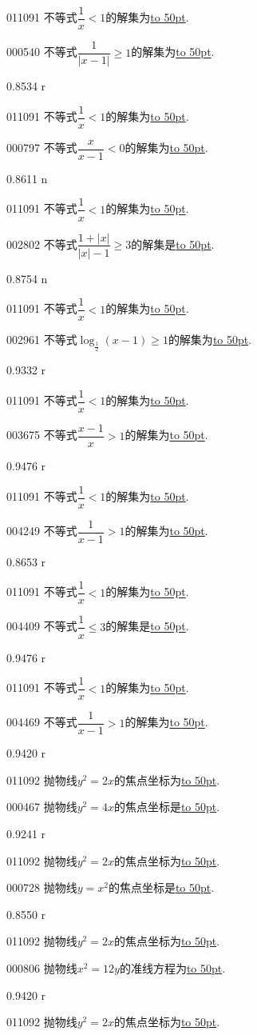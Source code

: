 \documentclass[10pt,a4paper]{article}
\newcommand{\blank}[1]{\underline{\hbox to #1pt{}}}
\begin{document}
011091	不等式$\dfrac 1x<1$的解集为\blank{50}.

000540	不等式$\dfrac1{|x-1|}\ge 1 $的解集为\blank{50}.

0.8534 r

011091	不等式$\dfrac 1x<1$的解集为\blank{50}.

000797	不等式$\dfrac x{x-1}<0$的解集为\blank{50}.

0.8611 n

011091	不等式$\dfrac 1x<1$的解集为\blank{50}.

002802	不等式$\dfrac{1+|x|}{|x|-1}\ge 3$的解集是\blank{50}.

0.8754 n

011091	不等式$\dfrac 1x<1$的解集为\blank{50}.

002961	不等式$\log_{\frac 12}(x-1)\ge 1$的解集为\blank{50}.

0.9332 r

011091	不等式$\dfrac 1x<1$的解集为\blank{50}.

003675	不等式$\dfrac{x-1}{x}>1$的解集为\blank{50}.

0.9476 r

011091	不等式$\dfrac 1x<1$的解集为\blank{50}.

004249	不等式$\dfrac 1{x-1}>1$的解集为\blank{50}.

0.8653 r

011091	不等式$\dfrac 1x<1$的解集为\blank{50}.

004409	不等式$\dfrac 1x\le 3$的解集是\blank{50}.

0.9476 r

011091	不等式$\dfrac 1x<1$的解集为\blank{50}.

004469	不等式$\dfrac 1{x-1}>1$的解集为\blank{50}.

0.9420 r

011092	抛物线$y^2=2x$的焦点坐标为\blank{50}.

000467	抛物线$y^2=4x$的焦点坐标是\blank{50}.

0.9241 r 

011092	抛物线$y^2=2x$的焦点坐标为\blank{50}.

000728	抛物线$y=x^2$的焦点坐标是\blank{50}.

0.8550 r

011092	抛物线$y^2=2x$的焦点坐标为\blank{50}.

000806	抛物线$x^2=12y$的准线方程为\blank{50}.

0.9420 r

011092	抛物线$y^2=2x$的焦点坐标为\blank{50}.
\end{document}
